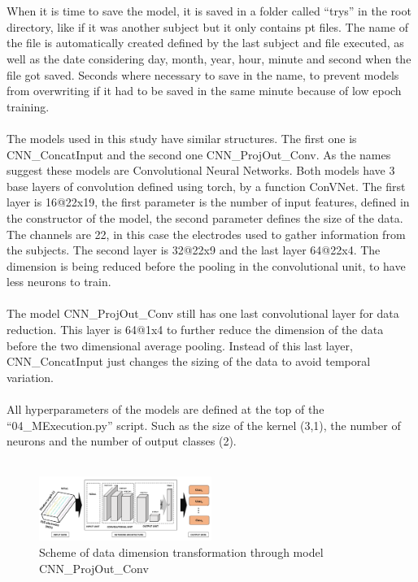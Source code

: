 \\\\
When it is time to save the model, it is saved in a folder called “trys” in the root directory, like if it was another subject but it only contains pt files. The name of the file is automatically created defined by the last subject and file executed, as well as the date considering day, month, year, hour, minute and second when the file got saved. Seconds where necessary to save in the name, to prevent models from overwriting if it had to be saved in the same minute because of low epoch training.
\\\\
The models used in this study have similar structures. The first one is CNN\_ConcatInput and the second one CNN\_ProjOut\_Conv. As the names suggest these models are Convolutional Neural Networks. Both models have 3 base layers of convolution defined using torch, by a function ConVNet. The first layer is 16@22x19, the first parameter is the number of input features, defined in the constructor of the model, the second parameter defines the size of the data. The channels are 22, in this case the electrodes used to gather information from the subjects. The second layer is 32@22x9 and the last layer 64@22x4. The dimension is being reduced before the pooling in the convolutional unit, to have less neurons to train.
\\\\
The model CNN\_ProjOut\_Conv still has one last convolutional layer for data reduction. This layer is 64@1x4 to further reduce the dimension of the data before the two dimensional average pooling. Instead of this last layer, CNN\_ConcatInput just changes the sizing of the data to avoid temporal variation.
\\\\
All hyperparameters of the models are defined at the top of the “04\_MExecution.py” script. Such as the size of the kernel (3,1), the number of neurons and the number of output classes (2).
\\
\leavevmode\\
\begin{figure}[h!]
  \caption{Scheme of data dimension transformation through model CNN\_ProjOut\_Conv}
  \centering
  \includegraphics[width=0.5\textwidth]{img/FeatureProjectorModel CHM.png}
\end{figure}
\leavevmode\\
